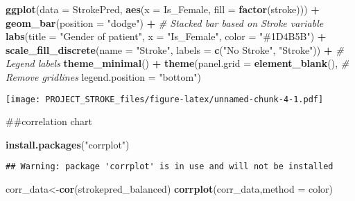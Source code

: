 \documentclass[
]{article}
\newenvironment{Shaded}{\begin{snugshade}}{\end{snugshade}}
\newcommand{\AttributeTok}[1]{\textcolor[rgb]{0.13,0.29,0.53}{#1}}
\newcommand{\CommentTok}[1]{\textcolor[rgb]{0.56,0.35,0.01}{\textit{#1}}}
\newcommand{\FunctionTok}[1]{\textcolor[rgb]{0.13,0.29,0.53}{\textbf{#1}}}
\newcommand{\NormalTok}[1]{#1}
\newcommand{\OtherTok}[1]{\textcolor[rgb]{0.56,0.35,0.01}{#1}}
\newcommand{\SpecialCharTok}[1]{\textcolor[rgb]{0.81,0.36,0.00}{\textbf{#1}}}
\newcommand{\StringTok}[1]{\textcolor[rgb]{0.31,0.60,0.02}{#1}}
\begin{document}
\begin{Shaded}
\begin{Highlighting}[]
\FunctionTok{ggplot}\NormalTok{(}\AttributeTok{data =}\NormalTok{ StrokePred, }\FunctionTok{aes}\NormalTok{(}\AttributeTok{x =}\NormalTok{ Is\_Female, }\AttributeTok{fill =} \FunctionTok{factor}\NormalTok{(stroke))) }\SpecialCharTok{+}
  \FunctionTok{geom\_bar}\NormalTok{(}\AttributeTok{position =} \StringTok{"dodge"}\NormalTok{) }\SpecialCharTok{+}  \CommentTok{\# Stacked bar based on Stroke variable}
   \FunctionTok{labs}\NormalTok{(}\AttributeTok{title =} \StringTok{"Gender of patient"}\NormalTok{, }\AttributeTok{x =} \StringTok{"Is\_Female"}\NormalTok{, }\AttributeTok{color =} \StringTok{"\#1D4B5B"}\NormalTok{) }\SpecialCharTok{+}
  \FunctionTok{scale\_fill\_discrete}\NormalTok{(}\AttributeTok{name =} \StringTok{"Stroke"}\NormalTok{, }\AttributeTok{labels =} \FunctionTok{c}\NormalTok{(}\StringTok{"No Stroke"}\NormalTok{, }\StringTok{"Stroke"}\NormalTok{)) }\SpecialCharTok{+}  \CommentTok{\# Legend labels}
  \FunctionTok{theme\_minimal}\NormalTok{() }\SpecialCharTok{+}
  \FunctionTok{theme}\NormalTok{(}\AttributeTok{panel.grid =} \FunctionTok{element\_blank}\NormalTok{(),  }\CommentTok{\# Remove gridlines}
        \AttributeTok{legend.position =} \StringTok{"bottom"}\NormalTok{)}
\end{Highlighting}
\end{Shaded}

\texttt{[image: PROJECT\_STROKE\_files/figure-latex/unnamed-chunk-4-1.pdf]}

\#\#correlation chart

\begin{Shaded}
\begin{Highlighting}[]
\FunctionTok{install.packages}\NormalTok{(}\StringTok{"corrplot"}\NormalTok{)}
\end{Highlighting}
\end{Shaded}

\begin{verbatim}
## Warning: package 'corrplot' is in use and will not be installed
\end{verbatim}

\begin{Shaded}
\begin{Highlighting}[]
\NormalTok{corr\_data}\OtherTok{\textless{}{-}}\FunctionTok{cor}\NormalTok{(strokepred\_balanced)}
\FunctionTok{corrplot}\NormalTok{(corr\_data,}\AttributeTok{method =} \StringTok{\textquotesingle{}color\textquotesingle{}}\NormalTok{)}
\end{Highlighting}
\end{Shaded}
\end{document}
